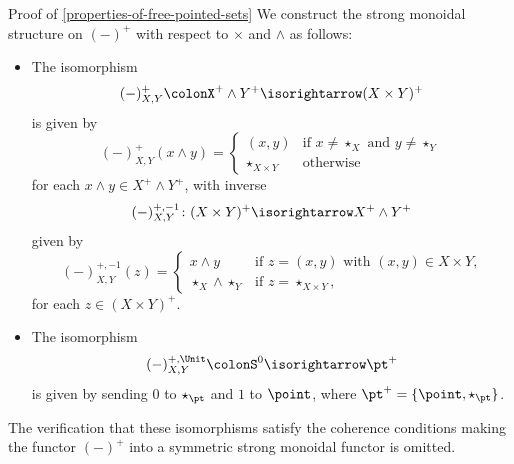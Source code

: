 \begin{Proof}{Proof of \cref{properties-of-free-pointed-sets}}
    We construct the strong monoidal structure on $(-)^{+}$ with respect to $\times$ and $\wedge$ as follows:
    \begin{itemize}
        \item{}The isomorphism
            \[
                (-)^{+}_{X,Y}%
                \colon%
                X^{+}\wedge Y^{+}%
                \isorightarrow
                (X\times Y)^{+}
            \]%
            is given by
            \[
                (-)^{+}_{X,Y}(x\wedge y)%
                =%
                \begin{cases}%
                    (x,y)             &\text{if $x\neq\star_{X}$ and $y\neq\star_{Y}$}\\%
                    \star_{X\times Y} &\text{otherwise}%
                \end{cases}%
            \]%
            for each $x\wedge y\in X^{+}\wedge Y^{+}$, with inverse
            \[
                (-)^{+,-1}_{X,Y}
                \colon%
                (X\times Y)^{+}
                \isorightarrow
                X^{+}\wedge Y^{+}%
            \]%
            given by
            \[
                (-)^{+,-1}_{X,Y}(z)%
                =%
                \begin{cases}
                    x\wedge y                &\text{if $z=(x,y)$ with $(x,y)\in X\times Y$,}\\
                    \star_{X}\wedge\star_{Y} &\text{if $z=\star_{X\times Y}$,}
                \end{cases}
            \]%
            for each $z\in(X\times Y)^{+}$.
        \item{}The isomorphism
            \[
                (-)^{+,\Unit}_{X,Y}%
                \colon%
                S^{0}%
                \isorightarrow
                \pt^{+}%
            \]%
            is given by sending $0$ to $\star_{\pt}$ and $1$ to $\point$, where $\pt^{+}=\{\point,\star_{\pt}\}$.
    \end{itemize}
    The verification that these isomorphisms satisfy the coherence conditions making the functor $(-)^{+}$ into a symmetric strong monoidal functor is omitted.
\end{Proof}
